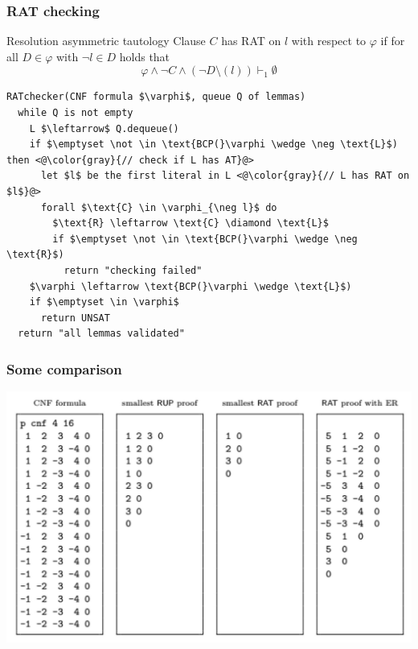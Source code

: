 \documentclass[xcolor=dvipsnames]{beamer}
\begin{document}
\begin{frame}[fragile]
  \frametitle{RAT checking}

    \begin{block}{Resolution asymmetric tautology}
    Clause $C$ has RAT on $l$  with respect to $\varphi$ if for all $D \in \varphi$ with $\neg l \in D$ holds that
    \[
        \varphi \wedge \neg C \wedge (\neg D \setminus (l)) \vdash_1 \emptyset
    \]
    \end{block}
\begin{lstlisting}
RATchecker(CNF formula $\varphi$, queue Q of lemmas)
  while Q is not empty
    L $\leftarrow$ Q.dequeue()
    if $\emptyset \not \in \text{BCP(}\varphi \wedge \neg \text{L}$) then <@\color{gray}{// check if L has AT}@>
      let $l$ be the first literal in L <@\color{gray}{// L has RAT on $l$}@>
      forall $\text{C} \in \varphi_{\neg l}$ do
        $\text{R} \leftarrow \text{C} \diamond \text{L}$
    	if $\emptyset \not \in \text{BCP(}\varphi \wedge \neg \text{R}$)
          return "checking failed"
    $\varphi \leftarrow \text{BCP(}\varphi \wedge \text{L}$)
    if $\emptyset \in \varphi$
      return UNSAT
  return "all lemmas validated"
\end{lstlisting}

\end{frame}

\begin{frame}
	\frametitle{Some comparison}
    \begin{center}
        \includegraphics[width=\textwidth,height=0.8\textheight,keepaspectratio]{formats.jpg}
    \end{center}
\end{frame}
\end{document}
